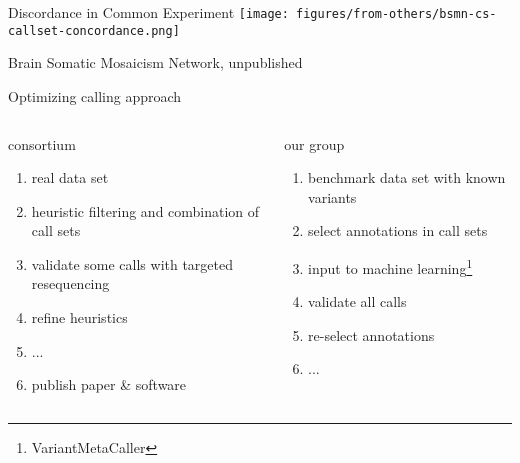 \documentclass{beamer}
\begin{document}
\begin{frame}{Discordance in Common Experiment}
\texttt{[image: figures/from-others/bsmn-cs-callset-concordance.png]}

\tiny{Brain Somatic Mosaicism Network, unpublished}
\end{frame}

\begin{frame}{Optimizing calling approach}
\begin{columns}[t]
\begin{column}{0.5\textwidth}
consortium
\begin{enumerate}
\item real data set
\item heuristic filtering and combination of call sets
\item validate some calls with targeted resequencing 
\item refine heuristics
\item ...  
\item publish paper \& software
\end{enumerate}
\end{column}

\begin{column}{0.5\textwidth}
our group
\begin{enumerate}
\item benchmark data set with known variants
\item select annotations in call sets
\item input to machine learning\footnote{VariantMetaCaller}
\item validate all calls
\item re-select annotations 
\item ...
\end{enumerate}
\end{column}
\end{columns}
\end{frame}
\end{document}
